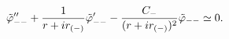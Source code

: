 \begin{equation}
{\tilde \varphi_{--}}''
+ {1 \over {r+ir_{(-)}}} {\tilde \varphi_{--}}'
- {C_- \over {(r+ir_{(-)})^2}}{\tilde \varphi_{--}}
\simeq 0.
\label{eq_approx_rmm}
\end{equation}

